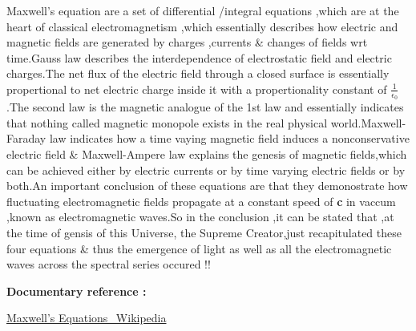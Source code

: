 Maxwell's equation are a set of differential /integral equations ,which are at the heart of classical electromagnetism ,which essentially describes how electric and magnetic fields are generated by charges ,currents \& changes of fields wrt time.Gauss law describes the interdependence of electrostatic field and electric charges.The net flux of the electric field through a closed surface is essentially propertional to net electric charge inside it with a propertionality constant of $ \frac{1}{\epsilon_{0}} $.The second law is the magnetic analogue of the 1st law and essentially indicates that nothing called magnetic monopole exists in the real physical world.Maxwell-Faraday law indicates how a time vaying magnetic field induces a nonconservative electric field \& Maxwell-Ampere law explains the genesis of magnetic fields,which can be achieved either by electric currents or by time varying electric fields or by both.An important conclusion of these equations are that they demonostrate how fluctuating electromagnetic fields propagate at a constant speed of {\bf{c}} in vaccum ,known as electromagnetic waves.So in the conclusion ,it can be stated that ,at the time of gensis of this Universe, the Supreme Creator,just recapitulated these four equations \& thus the emergence of light as well as all the electromagnetic waves across the spectral series occured !!


\bf{Documentary reference :}


\href{https://en.wikipedia.org/wiki/Maxwell\%27s\_equations}{Maxwell's Equations\_Wikipedia}

